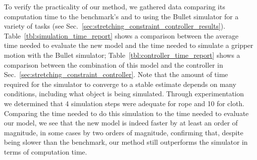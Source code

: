 To verify the practicality of our method, we gathered data comparing its computation time to the benchmark's and to using the Bullet simulator for a variety of tasks (see Sec.~\ref{sec:stretching_constraint_controller_results}). Table~\ref{tbl:simulation_time_report} shows a comparison between the average time needed to evaluate the new model and the time needed to simulate a gripper motion with the Bullet simulator; Table~\ref{tbl:controller_time_report} shows a comparison between the combination of this model and the controller in Sec.~\ref{sec:stretching_constraint_controller}. Note that the amount of time required for the simulator to converge to a stable estimate depends on many conditions, including what object is being simulated. Through experimentation we determined that 4 simulation steps were adequate for rope and 10 for cloth. Comparing the time needed to do this simulation to the time needed to evaluate our model, we see that the new model is indeed faster by at least an order of magnitude, in some cases by two orders of magnitude, confirming that, despite being slower than the benchmark, our method still outperforms the simulator in terms of computation time.



